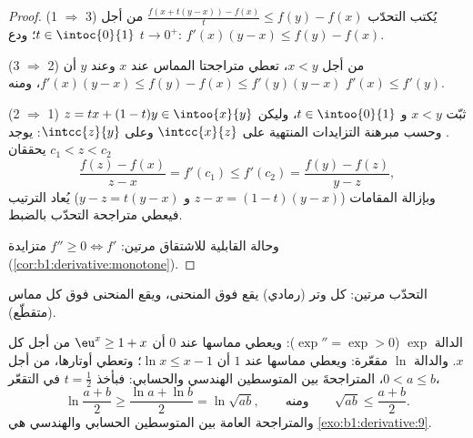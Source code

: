 \begin{proof}
(1 $\Rightarrow$ 3) يُكتب التحدّب $\frac{f(x + t(y-x)) -
f(x)}{t} \leq f(y) - f(x)$ من أجل $t \in \intoc{0}{1}$؛ ودع $t \to 0^+$:
$f'(x)(y - x) \leq f(y) - f(x)$.

(3 $\Rightarrow$ 2) من أجل $x < y$، تعطي متراجحتا المماس عند $x$
وعند $y$ أن $f'(x)(y-x) \leq f(y) - f(x) \leq f'(y)(y - x)$،
ومنه $f'(x) \leq f'(y)$.

(2 $\Rightarrow$ 1) ثبّت $x < y$ و $t \in \intoo{0}{1}$، وليكن $z
= tx + (1-t)y \in \intoo{x}{y}$. وحسب مبرهنة التزايدات المنتهية على
$\intcc{x}{z}$ وعلى $\intcc{z}{y}$: يوجد $c_1 < z < c_2$ يحققان
\[
\frac{f(z) - f(x)}{z - x} = f'(c_1) \leq f'(c_2)
= \frac{f(y) - f(z)}{y - z} ,
\]
وبإزالة المقامات ($z - x = (1-t)(y-x)$ و $y - z = t(y-x)$)
يُعاد الترتيب فيعطي متراجحة التحدّب بالضبط.

وحالة القابلية للاشتقاق مرتين: $f'' \geq 0 \iff f'$ متزايدة
(\cref{cor:b1:derivative:monotone}).
\end{proof}

\begin{omfigure}

{\small التحدّب مرتين: كل وتر (رمادي) يقع فوق المنحنى،
ويقع المنحنى فوق كل مماس (متقطّع).}
\end{omfigure}

\begin{example}\label{ex:b1:derivative:convexineq}
الدالة $\exp$  ($\exp'' = \exp > 0$): ويعطي مماسها عند $0$ أن
$\eu^x \geq 1 + x$ من أجل كل $x$. والدالة $\ln$ مقعّرة: ويعطي مماسها عند $1$
أن $\ln x \leq x - 1$؛ وتعطي أوتارها، من أجل $0 < a \leq b$،
المتراجحةَ بين المتوسطين الهندسي والحسابي: فبأخذ $t =
\frac12$ في التقعّر،
\[
\ln\frac{a + b}{2} \geq \frac{\ln a + \ln b}{2} = \ln\sqrt{ab},
\qquad\text{ومنه}\qquad
\sqrt{ab} \leq \frac{a+b}{2} .
\]
والمتراجحة العامة بين المتوسطين الحسابي والهندسي هي
\cref{exo:b1:derivative:9}.
\end{example}

